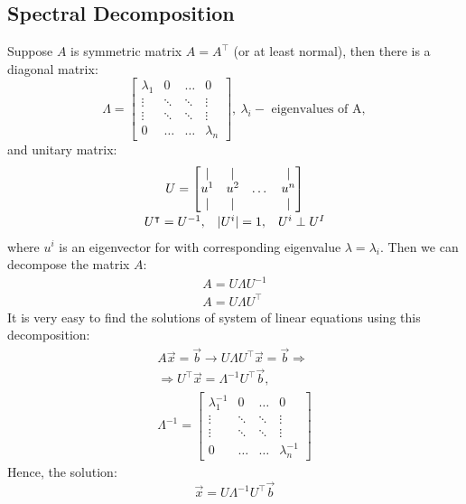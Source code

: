 \subsection*{Spectral Decomposition}
Suppose $A$ is symmetric matrix $A = A^\intercal$ (or at least normal), then there is a diagonal matrix:
\[
        \Lambda = \begin{bmatrix}
            \lambda_1 & 0 & \ldots & 0\\
            \vdots & \ddots &\ddots & \vdots\\
            \vdots & \ddots &\ddots & \vdots\\
            0 & \ldots & \ldots & \lambda_n
        \end{bmatrix}, \ \lambda_i - \text{ eigenvalues of A},
\]
and unitary matrix:
\[
    \begin{array}{c}
        U = \begin{bmatrix}
            | & | & \ & | \\
            u^{1} & u^{2} & \dots & u^{n} \\
            | & | & \ & |
        \end{bmatrix}    \\[0.5cm]
        U^\intercal = U^{-1}, \hspace*{3mm} |U^i| = 1, \hspace*{3mm} U^i \perp U^I    
    \end{array}
\]
where $u^i$ is an eigenvector for with corresponding eigenvalue $\lambda = \lambda_i$. Then we can decompose the matrix $A$:
\[
    \begin{array}{c}
        A = U \Lambda U^{-1}\\
        A = U \Lambda U^\intercal
    \end{array}  
\]
It is very easy to find the solutions of system of linear equations using this decomposition:
\[
    \begin{array}{c}
        A\vec{x} = \vec{b} \rightarrow U\Lambda U^\intercal \vec{x} = \vec{b} \Longrightarrow \\
        \Rightarrow U^\intercal \vec{x} = \Lambda^{-1} U^\intercal \vec{b}, \\[0.5cm]
        \Lambda^{-1} = \begin{bmatrix}
            \lambda_1^{-1} & 0 & \ldots & 0\\
            \vdots & \ddots &\ddots & \vdots\\
            \vdots & \ddots &\ddots & \vdots\\
            0 & \ldots & \ldots & \lambda_n^{-1}
        \end{bmatrix}
    \end{array}
\]
Hence, the solution:
\[
    \vec{x} = U\Lambda^{-1} U^\intercal \vec{b}  
\]
